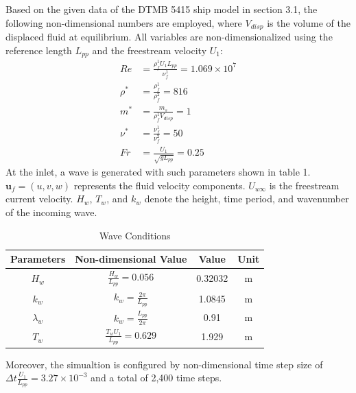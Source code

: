 \documentclass[12pt]{article} %
\begin{document}
Based on the given data of the DTMB 5415 ship model in section 3.1, the following non-dimensional numbers are employed, where \( V_{disp} \) is the volume of the displaced fluid at equilibrium. All variables are non-dimensionalized using the reference length \( L_{pp} \) and the freestream velocity \( U_1 \):
\begin{align*}
    Re &= \frac{\rho_f^1 U_1 L_{pp}}{\nu_f^1} = 1.069 \times 10^7 \\
    \rho^* &= \frac{\rho_f^1}{\rho_f^2} = 816 \\
    m^* &= \frac{m_s}{\rho_f^1 V_{disp}} = 1 \\
    \nu^* &= \frac{\nu_f^1}{\nu_f^2} = 50 \\
    Fr &= \frac{U_1}{\sqrt{g L_{pp}}} = 0.25
\end{align*}
At the inlet, a wave is generated with such parameters shown in table 1. \(\mathbf{u}_f = (u, v, w)\) represents the fluid velocity components. \(U_{u\infty}\) is the 
freestream current velocity. \(H_w\), \(T_w\), and \(k_w\) denote the height, time period, and 
wavenumber of the incoming wave.
\begin{table}[ht]
    \caption{Wave Conditions}
    \centering
    \begin{tabular}{|c|c|c|c|}
        \hline
        Parameters & Non-dimensional Value &Value & Unit\\
        \hline   
        $H_w$ & \(\frac{H_w}{L_{pp}} = 0.056\) &0.32032 & m \\
        $k_w$ & \(k_w = \frac{2\pi}{L_{pp}}\) &1.0845 & m\\
        $\lambda_w$ & \(k_w = \frac{L_{pp}}{2\pi}\) &0.91 & m\\
        $T_w$ & \(\frac{T_w U_1}{L_{pp}} = 0.629\) &1.929 & m \\
        \hline
    \end{tabular}
\end{table}

Moreover, the simualtion is configured by non-dimensional time step size of \(\Delta t \frac{U_1}{L_{pp}} = 3.27 \times 10^{-3}\) and a total of 2,400 time steps.
\end{document}
